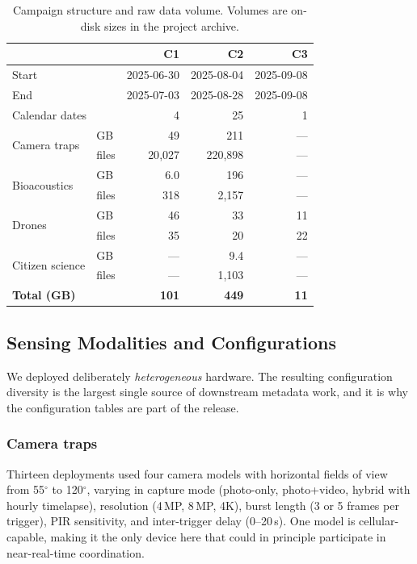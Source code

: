\documentclass[sigconf]{acmart}
\begin{document}
\begin{table}[t]
\caption{Campaign structure and raw data volume. Volumes are
on-disk sizes in the project archive.}
\label{tab:campaigns}
\small
\begin{tabular}{llrrr}
\toprule
& & \textbf{C1} & \textbf{C2} & \textbf{C3} \\
\midrule
\multicolumn{2}{l}{Start} & 2025-06-30 & 2025-08-04 & 2025-09-08 \\
\multicolumn{2}{l}{End} & 2025-07-03 & 2025-08-28 & 2025-09-08 \\
\multicolumn{2}{l}{Calendar dates} & 4 & 25 & 1 \\
\midrule
\multirow{2}{*}{Camera traps} & GB & 49 & 211 & --- \\
 & files & 20{,}027 & 220{,}898 & --- \\
\multirow{2}{*}{Bioacoustics} & GB & 6.0 & 196 & --- \\
 & files & 318 & 2{,}157 & --- \\
\multirow{2}{*}{Drones} & GB & 46 & 33 & 11 \\
 & files & 35 & 20 & 22 \\
\multirow{2}{*}{Citizen science} & GB & --- & 9.4 & --- \\
 & files & --- & 1{,}103 & --- \\
\midrule
\multicolumn{2}{l}{\textbf{Total (GB)}} & \textbf{101} & \textbf{449} & \textbf{11} \\
\bottomrule
\end{tabular}
\end{table}

\subsection{Sensing Modalities and Configurations}

We deployed deliberately \emph{heterogeneous} hardware. The resulting
configuration diversity is the largest single source of downstream
metadata work, and it is why the configuration tables are part of the
release.


\subsubsection{Camera traps}
Thirteen deployments used four camera models with horizontal fields of
view from 55$^\circ$ to 120$^\circ$, varying in capture mode (photo-only,
photo+video, hybrid with hourly timelapse), resolution (4\,MP, 8\,MP,
4K), burst length (3 or 5 frames per trigger), PIR sensitivity, and
inter-trigger delay (0--20\,s). One model is cellular-capable, making it
the only device here that could in principle participate in
near-real-time coordination.
\end{document}
